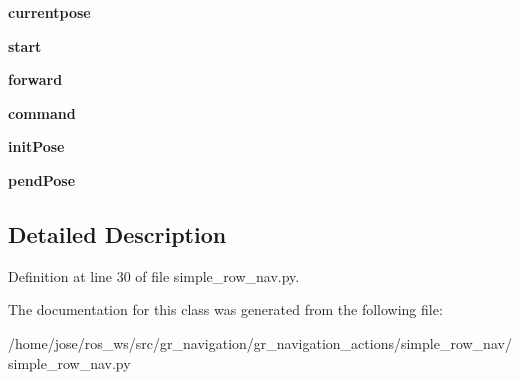 \begin{DoxyCompactItemize}
{\bfseries currentpose}
\item 
\mbox{\label{classsimple__row__nav_1_1SimpleRowNavController_a5b56e122ebacdc469279ceb15fe9025c}} 
{\bfseries start}
\item 
\mbox{\label{classsimple__row__nav_1_1SimpleRowNavController_aba83feb339258e0091f3e82bcaadd663}} 
{\bfseries forward}
\item 
\mbox{\label{classsimple__row__nav_1_1SimpleRowNavController_afd8413d9247aedf3e1425ef703ab91b5}} 
{\bfseries command}
\item 
\mbox{\label{classsimple__row__nav_1_1SimpleRowNavController_a9abba4807d494c063ed9017a7fe5a83f}} 
{\bfseries init\+Pose}
\item 
\mbox{\label{classsimple__row__nav_1_1SimpleRowNavController_a9173e0f8b8fd4eaf8f2f878f3dc2d286}} 
{\bfseries pend\+Pose}
\end{DoxyCompactItemize}


\subsection{Detailed Description}


Definition at line 30 of file simple\+\_\+row\+\_\+nav.\+py.



The documentation for this class was generated from the following file\+:\begin{DoxyCompactItemize}
\item 
/home/jose/ros\+\_\+ws/src/gr\+\_\+navigation/gr\+\_\+navigation\+\_\+actions/simple\+\_\+row\+\_\+nav/simple\+\_\+row\+\_\+nav.\+py\end{DoxyCompactItemize}
